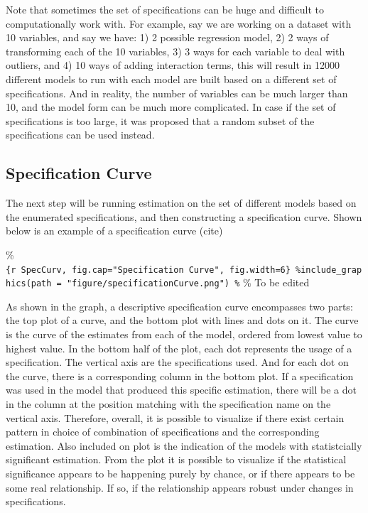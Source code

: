 \documentclass[12pt,twoside]{reedthesis}
\begin{document}
  \par 
  
  Note that sometimes the set of specifications can be huge and difficult
  to computationally work with. For example, say we are working on a
  dataset with 10 variables, and say we have: 1) 2 possible regression
  model, 2) 2 ways of transforming each of the 10 variables, 3) 3 ways for
  each variable to deal with outliers, and 4) 10 ways of adding
  interaction terms, this will result in 12000 different models to run
  with each model are built based on a different set of specifications.
  And in reality, the number of variables can be much larger than 10, and
  the model form can be much more complicated. In case if the set of
  specifications is too large, it was proposed that a random subset of the
  specifications can be used instead.
  
  \subsection{Specification Curve}\label{specification-curve}
  
  \par 
  
  The next step will be running estimation on the set of different models
  based on the enumerated specifications, and then constructing a
  specification curve. Shown below is an example of a specification curve
  (cite)
  
  \%\texttt{\{r\ SpecCurv,\ fig.cap="Specification\ Curve",\ fig.width=6\}\ \%include\_graphics(path\ =\ "figure/specificationCurve.png")\ \%}
  \% To be edited
  
  \par 
  
  As shown in the graph, a descriptive specification curve encompasses two
  parts: the top plot of a curve, and the bottom plot with lines and dots
  on it. The curve is the curve of the estimates from each of the model,
  ordered from lowest value to highest value. In the bottom half of the
  plot, each dot represents the usage of a specification. The vertical
  axis are the specifications used. And for each dot on the curve, there
  is a corresponding column in the bottom plot. If a specification was
  used in the model that produced this specific estimation, there will be
  a dot in the column at the position matching with the specification name
  on the vertical axis. Therefore, overall, it is possible to visualize if
  there exist certain pattern in choice of combination of specifications
  and the corresponding estimation. Also included on plot is the
  indication of the models with statistcially significant estimation. From
  the plot it is possible to visualize if the statistical significance
  appears to be happening purely by chance, or if there appears to be some
  real relationship. If so, if the relationship appears robust under
  changes in specifications.
  
\end{document}
